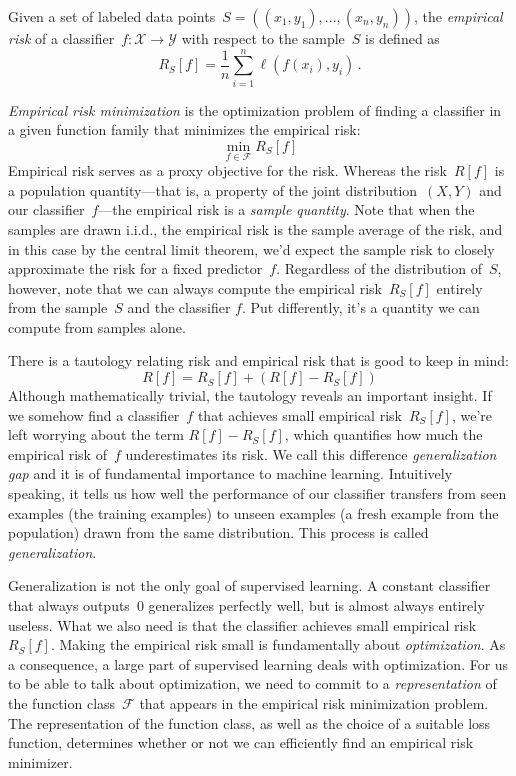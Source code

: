 \documentclass{tufte-book}
\begin{document}
\begin{Definition}

Given a set of labeled data points~\(S=((x_1,y_1),...,(x_n, y_n))\), the
\emph{empirical risk} of a
classifier~\(f\colon \mathcal{X}\to\mathcal{Y}\) with respect to the
sample~\(S\) is defined as \[
R_S[f] = \frac1n \sum_{i=1}^n \mathbb{\ell}( f(x_i), y_i )\,.
\]

\end{Definition}

\emph{Empirical risk minimization} is the optimization problem of
finding a classifier in a given function family that minimizes the
empirical risk: \[
\min_{f\in\mathcal{F}} R_S[f]
\] Empirical risk serves as a proxy objective for the risk. Whereas the
risk~\(R[f]\) is a population quantity---that is, a property of the
joint distribution~\((X, Y)\) and our classifier~\(f\)---the empirical
risk is a \emph{sample quantity}. Note that when the samples are drawn
i.i.d., the empirical risk is the sample average of the risk, and in
this case by the central limit theorem, we'd expect the sample risk to
closely approximate the risk for a fixed predictor~\(f\). Regardless of
the distribution of~\(S\), however, note that we can always compute the
empirical risk~\(R_S[f]\) entirely from the sample~\(S\) and the
classifier \(f\). Put differently, it's a quantity we can compute from
samples alone.

There is a tautology relating risk and empirical risk that is good to
keep in mind: \[
R[f] = R_S[f] + (R[f] - R_S[f])
\] Although mathematically trivial, the tautology reveals an important
insight. If we somehow find a classifier~\(f\) that achieves small
empirical risk~\(R_S[f]\), we're left worrying about the term
\(R[f]-R_S[f]\), which quantifies how much the empirical risk of~\(f\)
underestimates its risk. We call this difference \emph{generalization
gap} and it is of fundamental importance to machine learning.
Intuitively speaking, it tells us how well the performance of our
classifier transfers from seen examples (the training examples) to
unseen examples (a fresh example from the population) drawn from the
same distribution. This process is called \emph{generalization}.

Generalization is not the only goal of supervised learning. A constant
classifier that always outputs~\(0\) generalizes perfectly well, but is
almost always entirely useless. What we also need is that the classifier
achieves small empirical risk~\(R_S[f]\). Making the empirical risk
small is fundamentally about \emph{optimization}. As a consequence, a
large part of supervised learning deals with optimization. For us to be
able to talk about optimization, we need to commit to a
\emph{representation} of the function class~\(\mathcal{F}\) that appears
in the empirical risk minimization problem. The representation of the
function class, as well as the choice of a suitable loss function,
determines whether or not we can efficiently find an empirical risk
minimizer.
\end{document}
